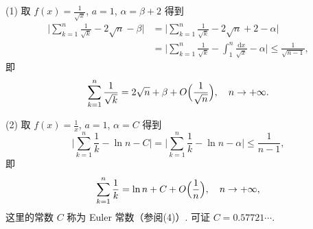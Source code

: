 \begin{example}\label{ex:12.3.8}
(1) 取 $f(x)=\frac{1}{\sqrt{x}}$, $a=1$, $\alpha=\beta+2$ 得到
\[
\begin{aligned}
  \biggl|\sum_{k=1}^{n}\frac{1}{\sqrt{k}}-2\sqrt{n}-\beta\biggr|
  &=\biggl|\sum_{k=1}^{n}\frac{1}{\sqrt{k}}-2\sqrt{n}+2-\alpha\biggr|\\
  &=\biggl|\sum_{k=1}^{n}\frac{1}{\sqrt{k}}-\int_{1}^{n}\frac{\mathrm{d}x}{\sqrt{x}}-\alpha\biggr|
   \leqslant\frac{1}{\sqrt{n-1}},
\end{aligned}
\]
即
\[
  \sum_{k=1}^{n}\frac{1}{\sqrt{k}}=2\sqrt{n}+\beta+O\Bigl(\frac{1}{\sqrt{n}}\Bigr),
  \quad n\to+\infty.
\]

(2) 取 $f(x)=\frac{1}{x}$, $a=1$, $\alpha=C$ 得到
\[
  \biggl|\sum_{k=1}^{n}\frac{1}{k}-\ln n-C\biggr|
  =\biggl|\sum_{k=1}^{n}\frac{1}{k}-\ln n-\alpha\biggr|
  \leqslant\frac{1}{n-1},
\]
即
\[
  \sum_{k=1}^{n}\frac{1}{k}=\ln n+C+O\Bigl(\frac{1}{n}\Bigr),
  \quad n\to+\infty,
\]
这里的常数 $C$ 称为 Euler 常数（参阅(4)）. 可证 $C=0.57721\cdots$.
\end{example}

